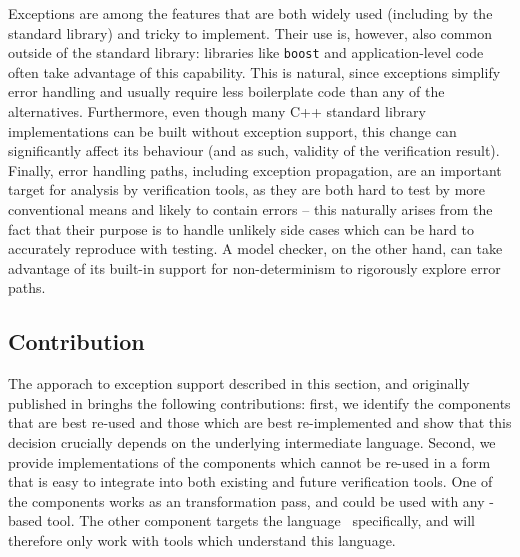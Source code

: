 Exceptions are among the features that are both widely used (including
by the standard library) and tricky to implement.
Their use is, however, also common outside of the standard library: libraries
like \texttt{boost} and application-level code often take advantage of this
capability.
This is natural, since exceptions simplify error handling and usually require
less boilerplate code than any of the alternatives.
Furthermore, even though many C++ standard library implementations can
be built without exception support, this change can significantly affect its behaviour
(and as such, validity of the verification result).
Finally, error handling paths, including exception propagation, are an
important target for analysis by verification tools, as they are both hard to
test by more conventional means and likely to contain errors -- this naturally
arises from the fact that their purpose is to handle unlikely side cases which
can be hard to accurately reproduce with testing.
A model checker, on the other hand, can take advantage of its built-in support
for non-determinism to rigorously explore error paths.

\subsection{Contribution}\label{contribution}

The apporach to exception support described in this section, and originally published in  bringhs the following contributions:
first, we identify the
components that are best re-used and those which are best re-implemented
and show that this decision crucially depends on the underlying
intermediate language. Second, we provide implementations of the
components which cannot be re-used in a form that is easy to integrate
into both existing and future verification tools. One of the components
works as an \llvm{} transformation pass, and could be used with any
\llvm{}-based tool. The other component targets the \divm{}
language~ specifically, and will therefore only
work with tools which understand this language.

